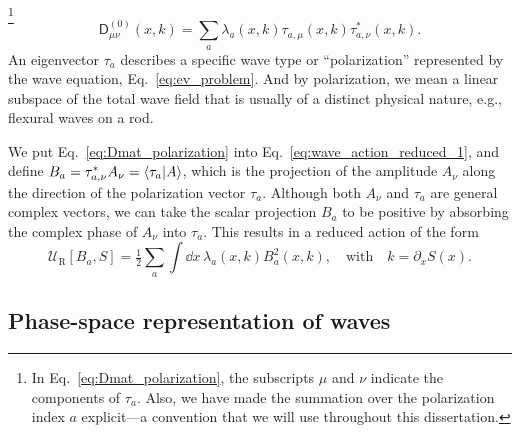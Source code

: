 \footnote{In Eq.~\eqref{eq:Dmat_polarization}, the subscripts $\mu$ and $\nu$ indicate the components of $\tau_{a}$.
Also, we have made the summation over the polarization index $a$ explicit---a convention that we will use throughout this dissertation.}
%
\begin{equation}
  \mathsf{D}^{(0)}_{\mu\nu}(x, k) = \sum_{a} \lambda_{a}(x, k) \tau_{a, \mu}(x, k) \tau_{a, \nu}^{*}(x, k).
  \label{eq:Dmat_polarization}
\end{equation}
%
An eigenvector $\tau_{a}$ describes a specific wave type or ``polarization'' represented by the wave equation, Eq.~\eqref{eq:ev_problem}.
And by polarization, we mean a linear subspace of the total wave field that is usually of a distinct physical nature, e.g., flexural waves on a rod.

We put Eq.~\eqref{eq:Dmat_polarization} into Eq.~\eqref{eq:wave_action_reduced_1}, and define $B_{a} = \tau_{a, \nu}^{*}A_{\nu} = \mathinner{\langle{\tau_{a}|A}\rangle}$, which is the projection of the amplitude $A_{\nu}$ along the direction of the polarization vector $\tau_{a}$.
Although both $A_{\nu}$ and $\tau_{a}$ are general complex vectors, we can take the scalar projection $B_{a}$ to be positive by absorbing the complex phase of $A_{\nu}$ into $\tau_{a}$.
This results in a reduced action of the form
%
\begin{equation}
  \mathscr{U}_{\text{R}}\left[B_{a}, S\right] = \tfrac{1}{2} \sum_{a} \int \dd{x}\, \lambda_{a}(x,k) B_{a}^{2}(x, k),
  \quad\text{with}\quad
  k = \partial_{x}S(x).
  \label{eq:reduced_action}
\end{equation}

\subsection{Phase-space representation of waves}


